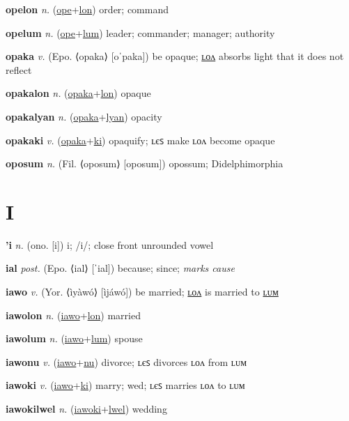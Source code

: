 \textbf{\hypertarget{opelon}{opelon}} \textit{n.} (\hyperlink{ope}{ope}+\allowbreak \hyperlink{lon}{lon})
order; command

\textbf{\hypertarget{opelum}{opelum}} \textit{n.} (\hyperlink{ope}{ope}+\allowbreak \hyperlink{lum}{lum})
leader; commander; manager; authority

\textbf{\hypertarget{opaka}{opaka}} \textit{v.} (Epo. ⟨opaka⟩ [oˈpaka])
be opaque; \hyperlink{opakalon}{ʟᴏᴧ} absorbs light that it does not reflect

\textbf{\hypertarget{opakalon}{opakalon}} \textit{n.} (\hyperlink{opaka}{opaka}+\allowbreak \hyperlink{lon}{lon})
opaque

\textbf{\hypertarget{opakalyan}{opakalyan}} \textit{n.} (\hyperlink{opaka}{opaka}+\allowbreak \hyperlink{lyan}{lyan})
opacity

\textbf{\hypertarget{opakaki}{opakaki}} \textit{v.} (\hyperlink{opaka}{opaka}+\allowbreak \hyperlink{ki}{ki})
opaquify; ʟєꜱ make ʟᴏᴧ become opaque

\textbf{\hypertarget{oposum}{oposum}} \textit{n.} (Fil. ⟨oposum⟩ [oposum])
opossum; Didelphimorphia

\section{I}

\textbf{\hypertarget{'i}{'i}} \textit{n.} (ono. [i])
i; /i/; close front unrounded vowel

\textbf{\hypertarget{ial}{ial}} \textit{post.} (Epo. ⟨ial⟩ [ˈial])
because; since; \textit{marks cause}

\textbf{\hypertarget{iawo}{iawo}} \textit{v.} (Yor. ⟨ìyàwó⟩ [ìjáwó])
be married; \hyperlink{iawolon}{ʟᴏᴧ} is married to \hyperlink{iawolum}{ʟᴜᴍ}

\textbf{\hypertarget{iawolon}{iawolon}} \textit{n.} (\hyperlink{iawo}{iawo}+\allowbreak \hyperlink{lon}{lon})
married

\textbf{\hypertarget{iawolum}{iawolum}} \textit{n.} (\hyperlink{iawo}{iawo}+\allowbreak \hyperlink{lum}{lum})
spouse

\textbf{\hypertarget{iawonu}{iawonu}} \textit{v.} (\hyperlink{iawo}{iawo}+\allowbreak \hyperlink{nu}{nu})
divorce; ʟєꜱ divorces ʟᴏᴧ from ʟᴜᴍ

\textbf{\hypertarget{iawoki}{iawoki}} \textit{v.} (\hyperlink{iawo}{iawo}+\allowbreak \hyperlink{ki}{ki})
marry; wed; ʟєꜱ marries ʟᴏᴧ to ʟᴜᴍ

\textbf{\hypertarget{iawokilwel}{iawokilwel}} \textit{n.} (\hyperlink{iawoki}{iawoki}+\allowbreak \hyperlink{lwel}{lwel})
wedding

